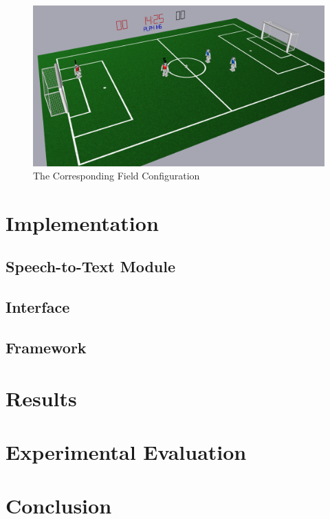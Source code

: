 \documentclass[a4paper, onecolumn, 12pt]{article}
\begin{document}
\begin{figure}[H]
    \centering
    \includegraphics[width=0.9\linewidth]{assets/simrobot.png}
    \caption{The Corresponding Field Configuration}
    \label{fig:nao}
\end{figure}

\section{Implementation}
\label{sec:impl}

\subsection{Speech-to-Text Module}


\subsection{Interface}


\subsection{Framework}



\section{Results}
\label{sec:res}


\section{Experimental Evaluation}


\section{Conclusion}
\label{sec:con}




\end{document}
